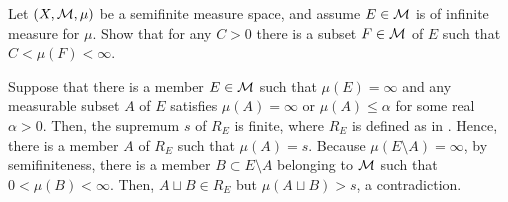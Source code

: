 \begin{prob}[Exercise 1.14]\label{semifiniteness strengthened to}
    Let $(X, {\mathcal{M}}, \mu)$ be a semifinite measure space, and assume $E\in{\mathcal{M}}$ is of infinite measure for $\mu$.
    Show that for any $C>0$ there is a subset $F\in{\mathcal{M}}$ of $E$ such that $C<\mu(F)<\infty$.
\end{prob}
\begin{sol}
    Suppose that there is a member $E\in{\mathcal{M}}$ such that $\mu(E)=\infty$ and any measurable subset $A$ of $E$ satisfies $\mu(A)=\infty$ or $\mu(A)\leq\alpha$ for some real $\alpha>0$.
    Then, the supremum $s$ of $R_E$ is finite, where $R_E$ is defined as in \pageref{maximal measurable subset of finite measure}.
    Hence, there is a member $A$ of $R_E$ such that $\mu(A)=s$.
    Because $\mu(E\setminus A)=\infty$, by semifiniteness, there is a member $B\subset E\setminus A$ belonging to ${\mathcal{M}}$ such that $0<\mu(B)<\infty$.
    Then, $A\sqcup B\in R_E$ but $\mu(A\sqcup B)>s$, a contradiction.
\end{sol}

